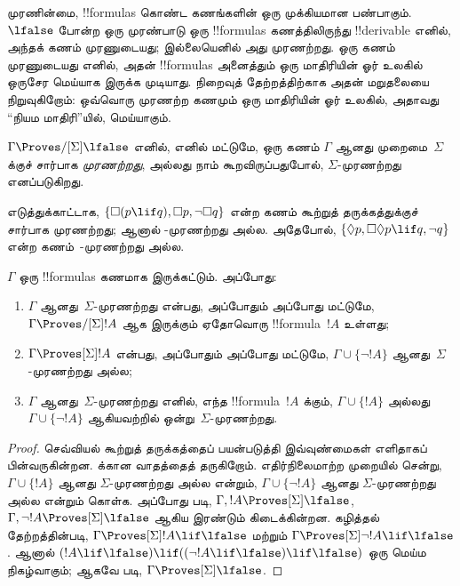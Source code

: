 \documentclass[../../../include/open-logic-section]{subfiles}
\begin{document}


முரணின்மை, !!{formula}s கொண்ட கணங்களின் ஒரு முக்கியமான பண்பாகும்.
$\lfalse$ போன்ற ஒரு முரண்பாடு ஒரு !!{formula}s கணத்திலிருந்து
!!{derivable} எனில், அந்தக் கணம் முரணுடையது; இல்லையெனில் அது முரணற்றது.
ஒரு கணம் முரணுடையது எனில், அதன் !!{formula}s அனைத்தும் ஒரு மாதிரியின்
ஓர் உலகில் ஒருசேர மெய்யாக இருக்க முடியாது. நிறைவுத் தேற்றத்திற்காக அதன்
மறுதலையை நிறுவுகிறோம்: ஒவ்வொரு முரணற்ற கணமும் ஒரு மாதிரியின் ஓர் உலகில்,
அதாவது “நியம மாதிரி”யில், மெய்யாகும்.

\begin{defn}
  $\Gamma \Proves/[\Sigma] \lfalse$ எனில், எனில் மட்டுமே, ஒரு கணம்
  $\Gamma$ ஆனது முறைமை~$\Sigma$ க்குச் சார்பாக \emph{முரணற்றது}, அல்லது
  நாம் கூறவிருப்பதுபோல், $\Sigma$-முரணற்றது எனப்படுகிறது.
\end{defn}

எடுத்துக்காட்டாக, $\{ \Box(p \lif q), \Box p, \lnot\Box q \}$ என்ற கணம்
கூற்றுத் தருக்கத்துக்குச் சார்பாக முரணற்றது; ஆனால்
-முரணற்றது அல்ல. அதேபோல், $\{ \Diamond p, \Box\Diamond
p \lif q, \lnot q \}$ என்ற கணம்~-முரணற்றது அல்ல.

\begin{prop}
  $\Gamma$ ஒரு !!{formula}s கணமாக இருக்கட்டும். அப்போது:
  \begin{enumerate}
  \item $\Gamma$ ஆனது~$\Sigma$-முரணற்றது என்பது, அப்போதும் அப்போது மட்டுமே,
    $\Gamma \Proves/[\Sigma] !A$ ஆக இருக்கும் ஏதோவொரு !!{formula}~$!A$
    உள்ளது;
  \item {}%
    $\Gamma \Proves[\Sigma] !A$ என்பது, அப்போதும் அப்போது மட்டுமே,
    $\Gamma \cup \{ \lnot!A \}$ ஆனது~$\Sigma$-முரணற்றது அல்ல;
  \item {}%
    $\Gamma$ ஆனது~$\Sigma$-முரணற்றது எனில், எந்த !!{formula}~$!A$ க்கும்,
    $\Gamma \cup \{ !A \}$ அல்லது $\Gamma \cup \{ \lnot!A \}$
    ஆகியவற்றில் ஒன்று~$\Sigma$-முரணற்றது.
  \end{enumerate}
\end{prop}

\begin{proof}
  செவ்வியல் கூற்றுத் தருக்கத்தைப் பயன்படுத்தி இவ்வுண்மைகள் எளிதாகப்
  பின்வருகின்றன.  க்கான வாதத்தைத் தருகிறோம்.
  எதிர்நிலைமாற்ற முறையில் சென்று, $\Gamma \cup \{ !A \}$ ஆனது
  $\Sigma$-முரணற்றது அல்ல என்றும், $\Gamma \cup \{ \lnot!A \}$ ஆனது
  $\Sigma$-முரணற்றது அல்ல என்றும் கொள்க.
  அப்போது  படி, $\Gamma, !A
  \Proves[\Sigma] \lfalse$, $\Gamma, \lnot !A \Proves[\Sigma]
  \lfalse$ ஆகிய இரண்டும் கிடைக்கின்றன. கழித்தல் தேற்றத்தின்படி,
  $\Gamma \Proves[\Sigma] !A \lif \lfalse$ மற்றும்
  $\Gamma \Proves[\Sigma] \lnot!A \lif \lfalse$. ஆனால் $(!A \lif
  \lfalse) \lif ((\lnot!A \lif \lfalse) \lif \lfalse)$ ஒரு மெய்ம
  நிகழ்வாகும்; ஆகவே
  படி, $\Gamma \Proves[\Sigma] \lfalse$.
\end{proof}
\end{document}
